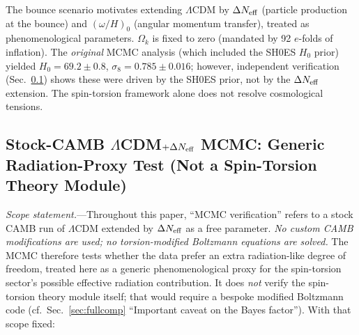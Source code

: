 \documentclass[aps,prd,twocolumn,superscriptaddress,showpacs,preprintnumbers,nofootinbib,longbibliography,floatfix]{revtex4-2}
\newcommand{\Neff}{N_{\rm eff}}
\begin{document}
The bounce scenario motivates extending $\Lambda$CDM by $\Delta\Neff$ (particle production at the bounce) and $(\omega/H)_0$ (angular momentum transfer), treated as phenomenological parameters. $\Omega_k$ is fixed to zero (mandated by 92 $e$-folds of inflation). The \textit{original} MCMC analysis (which included the SH0ES $H_0$ prior) yielded $H_0 = 69.2 \pm 0.8$, $\sigma_8 = 0.785 \pm 0.016$; however, independent verification (Sec.~\ref{sec:verification}) shows these were driven by the SH0ES prior, not by the $\Delta\Neff$ extension. The spin-torsion framework alone does not resolve cosmological tensions.

\subsection{Stock-CAMB $\Lambda$CDM$+\Delta\Neff$ MCMC: Generic Radiation-Proxy Test (Not a Spin-Torsion Theory Module)}\label{sec:verification}

\textit{Scope statement.}---Throughout this paper, ``MCMC verification'' refers to a stock CAMB run of $\Lambda$CDM extended by $\Delta\Neff$ as a free parameter. \emph{No custom CAMB modifications are used; no torsion-modified Boltzmann equations are solved.} The MCMC therefore tests whether the data prefer an extra radiation-like degree of freedom, treated here as a generic phenomenological proxy for the spin-torsion sector's possible effective radiation contribution. It does \emph{not} verify the spin-torsion theory module itself; that would require a bespoke modified Boltzmann code (cf.\ Sec.~\ref{sec:fullcomp} ``Important caveat on the Bayes factor''). With that scope fixed:
\end{document}
